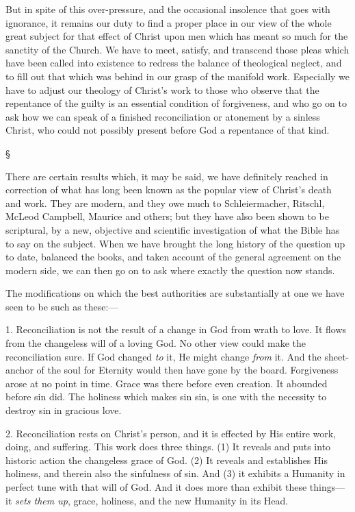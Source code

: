 \documentclass[12pt,a5paper,twoside,titlepage]{book}
\begin{document}
But in spite of this over-pressure, and the 
occasional insolence that goes with ignorance, 
it remains our duty to find a proper place in 
our view of the whole great subject for that 
effect of Christ upon men which has meant so 
much for the sanctity of the Church. We have 
to meet, satisfy, and transcend those pleas which 
have been called into existence to redress the 
balance of theological neglect, and to fill out 
that which was behind in our grasp of the 
manifold work. Especially we have to adjust 
our theology of Christ's work to those who 
observe that the repentance of the guilty is an 
essential condition of forgiveness, and who go 
on to ask how we can speak of a finished 
reconciliation or atonement by a sinless Christ, 
who could not possibly present before God a 
repentance of that kind. 

\begin{center}
\S
\end{center}

There are certain results which, it may be 
said, we have definitely reached in correction 
of what has long been known as the popular 
view of Christ's death and work. They are 
modern, and they owe much to Schleiermacher, 
Ritschl, McLeod Campbell, Maurice and others; 
but they have also been shown to be scriptural, 
by a new, objective and scientific investigation 
of what the Bible has to say on the subject. 
When we have brought the long history of 
the question up to date, balanced the books, 
and taken account of the general agreement 
on the modern side, we can then go on to ask 
where exactly the question now stands. 

The modifications on which the best authorities 
are substantially at one we have seen to be 
such as these:--- 

1. Reconciliation is not the result of a change 
in God from wrath to love. It flows from the 
changeless will of a loving God. No other view 
could make the reconciliation sure. If God 
changed \textit{to} it, He might change \textit{from} it. And 
the sheet-anchor of the soul for Eternity would 
then have gone by the board. Forgiveness 
arose at no point in time. Grace was there 
before even creation. It abounded before sin 
did. The holiness which makes sin sin, is one 
with the necessity to destroy sin in gracious 
love. 

2. Reconciliation rests on Christ's person, 
and it is effected by His entire work, doing, and 
suffering. This work does three things. (1) It 
reveals and puts into historic action the changeless 
grace of God. (2) It reveals and establishes 
His holiness, and therein also the sinfulness of 
sin. And (3) it exhibits a Humanity in perfect 
tune with that will of God. And it does more 
than exhibit these things---it \textit{sets them up}, grace, 
holiness, and the new Humanity in its Head. 
\end{document}
